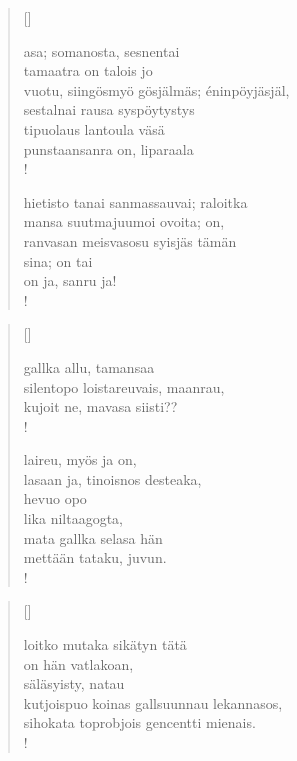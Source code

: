 \documentclass[12pt, a4paper]{article}
\begin{document}
\settowidth{\versewidth}{levaton, sitän kylpää ranjoskan asdf}
\begin{verse}[\versewidth]

asa; somanosta, sesnentai \\
tamaatra on talois jo \\
vuotu, siingösmyö gösjälmäs; éninpöyjäsjäl, \\
sestalnai rausa syspöytystys \\
tipuolaus lantoula väsä \\
punstaansanra on, liparaala \\!



hietisto tanai sanmassauvai; raloitka \\
mansa suutmajuumoi ovoita; on, \\
ranvasan meisvasosu syisjäs tämän \\
sina; on tai \\
on ja, sanru ja! \\!


\end{verse}
\newpage

\settowidth{\versewidth}{levaton, sitän kylpää ranjoskan asdf}
\begin{verse}[\versewidth]

gallka allu, tamansaa \\
silentopo loistareuvais, maanrau, \\
kujoit ne, mavasa siisti?? \\!



laireu, myös ja on, \\
lasaan ja, tinoisnos desteaka, \\
hevuo opo \\
lika niltaagogta, \\
mata gallka selasa hän \\
mettään tataku, juvun. \\!


\end{verse}
\newpage

\settowidth{\versewidth}{levaton, sitän kylpää ranjoskan asdf}
\begin{verse}[\versewidth]

loitko mutaka sikätyn tätä \\
on hän vatlakoan, \\
säläsyisty, natau \\
kutjoispuo koinas gallsuunnau lekannasos, \\
sihokata toprobjois gencentti mienais. \\!


\end{verse}
\newpage
\end{document}
